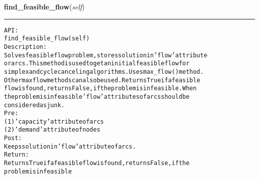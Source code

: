     \label{coinor:gimpy:graph:Graph:find_feasible_flow}

    \vspace{0.5ex}

\hspace{.8\funcindent}\begin{boxedminipage}{\funcwidth}

    \raggedright \textbf{find\_feasible\_flow}(\textit{self})

    \vspace{-1.5ex}

    \rule{\textwidth}{0.5\fboxrule}
\setlength{\parskip}{2ex}
\begin{alltt}

API:
    find\_feasible\_flow(self)
Description:
    Solves feasible flow problem, stores solution in 'flow' attribute
    or arcs. This method is used to get an initial feasible flow for
    simplex and cycle canceling algorithms. Uses max\_flow() method.
    Other max flow methods can also be used. Returns True if a feasible
    flow is found, returns False, if the problem is infeasible. When
    the problem is infeasible 'flow' attributes of arcs should be
    considered as junk.
Pre:
    (1) 'capacity' attribute of arcs
    (2) 'demand' attribute of nodes
Post:
    Keeps solution in 'flow' attribute of arcs.
Return:
    Returns True if a feasible flow is found, returns False, if the
    problem is infeasible
\end{alltt}

\setlength{\parskip}{1ex}
    \end{boxedminipage}

    \label{coinor:gimpy:graph:Graph:get_approximate_diameter}

    \vspace{0.5ex}

